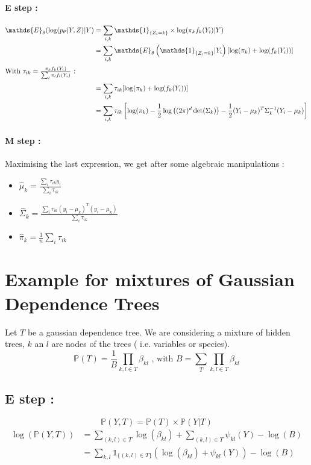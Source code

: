 \documentclass[a4paper,10pt]{article}
\begin{document}
\paragraph{E step :}



\begin{align*}
\mathds{E}_\theta (\log(p_\theta(Y,Z)|Y) &= \sum_{i,k} \mathds{1}_{\{Z_i = k\}} \times \log(\pi_k f_k(Y_i)|Y)\\
&= \sum_{i,k} \mathds{E}_\theta \left( \mathds{1}_{\{Z_i = k\}} |Y_i\right)[\log(\pi_k) + \log(f_k(Y_i)) ]\\
\intertext{With $\tau_{ik} = \frac{\pi_k f_k(Y_i)}{\sum_{l} \pi_l f_l(Y_i)}$ :}
&= \sum_{i,k}\tau_{ik}[\log(\pi_k) + \log(f_k(Y_i)) ] \\
&= \sum_{i,k}\tau_{ik}\left[\log(\pi_k)-\frac{1}{2}\log\left((2\pi)^d\det(\Sigma_k)\right) - \frac{1}{2}(Y_i - \mu_k)^T\Sigma_k^{-1}(Y_i - \mu_k)\right] \\
\end{align*}


\paragraph{M step :}
Maximising the last expression, we get after some algebraic manipulations :
\begin{itemize}
\item \large{$\hat{\mu}_k = \frac{\sum_i \tau_{ik} y_i}{\sum_i \tau_{ik}}$}\normalsize
\item \large{$\hat{\Sigma}_k = \frac{\sum_i \tau_{ik} (y_i-\mu_k)^T(y_i-\mu_k)}{\sum_i \tau_{ik}}$}\normalsize
\item \large{$\hat{\pi}_k = \frac{1}{n} \sum_i \tau_{ik}$}
\end{itemize}

\section{Example for mixtures of Gaussian Dependence Trees}
Let $T$ be a gaussian dependence tree. We are considering a mixture of hidden trees, $k$ an $l$  are nodes of the trees (
i.e. variables or species).\\

\[ \mathds{P}(T) = \frac{1}{B}\prod_{k,l\in T} \beta_{kl} \text{ , with } B = \sum_T \prod_{k,l\in T} \beta_{kl} \]
\subsection{E step :}
\[ \mathds{P}(Y,T) = \mathds{P}(T)\times\mathds{P}(Y|T)\]
\begin{align*}
 \log(\mathds{P}(Y,T)) &= \sum_{(k,l)\in T} \log(\beta_{kl})  + \sum_{(k,l)\in T} \psi_{kl}(Y)- \log (B)\\
 &=\sum_{k,l} \mathds{1}_{\{(k,l) \in T\}} \left(\log(\beta_{kl})  +  \psi_{kl}(Y)\right)- \log (B)
\end{align*}
 
\end{document}
